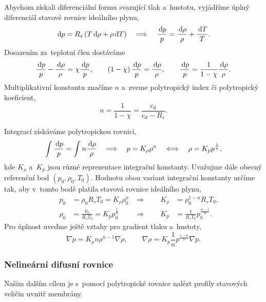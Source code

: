 Abychom získali diferenciální formu svazující tlak a~hustotu, vyjádříme úplný diferenciál stavové rovnice ideálního plynu,
\begin{equation}
    \,\mathrm{d}{p} = R_s\left(T\,\mathrm{d}{\rho} + \rho\,\mathrm{d}{T}\right) \quad \Longrightarrow \quad \frac{\,\mathrm{d}{p}}{p}=\frac{\,\mathrm{d}{\rho}}{\rho}+\frac{\,\mathrm{d}{T}}{T}.
\end{equation}
Dosazením za~teplotní člen dostáváme
\begin{equation}
    \frac{\,\mathrm{d}{p}}{p}-\frac{\,\mathrm{d}{\rho}}{\rho}=\chi\frac{\,\mathrm{d}{p}}{p}, \qquad
    \left(1-\chi\right)\frac{\,\mathrm{d}{p}}{p}=\frac{\,\mathrm{d}{\rho}}{\rho}, \qquad \frac{\,\mathrm{d}{p}}{p}=\frac{1}{1-\chi}\frac{\,\mathrm{d}{\rho}}{\rho}.
\end{equation}
Multiplikativní konstantu značíme $n$ a~zveme polytropický index či polytropický koeficient,
\begin{equation}
    n=\frac{1}{1-\chi}=\frac{c_d}{c_d-R_s}.
\end{equation}

Integrací získáváme polytropickou rovnici,
\begin{equation}\label{eq:polytropic_state_equation}
    \int \frac{\,\mathrm{d}{p}}{p}=\int n \frac{\,\mathrm{d}{\rho}}{\rho}\quad\Longrightarrow\quad p= K_\rho \rho^n\quad\Longleftrightarrow\quad \rho=K_p p^{\frac{1}{n}},
\end{equation}
kde $K_\rho$ a~$K_p$ jsou různé reprezentace integrační konstanty. Uvažujme dále obecný referenční bod $\left(p_0, \rho_0, T_0\right)$. Hodnotu obou variant integrační konstanty určíme tak, aby v~tomto bodě platila stavová rovnice ideálního plynu,
\begin{subequations}
    \begin{align}
        &&&&p_0&=\rho_0 R_s T_0 = K_\rho \rho_0^n &\Longrightarrow\qquad  K_\rho  &= \rho_0^{1-n} R_s T_0,&&\\
        &&&&\rho_0&=\frac{p_0}{R_s T_0}=K_p p_0^{\frac{1}{n}}&\Longrightarrow\qquad  K_p &= \frac{1}{R_s T_0}p_0^{\frac{n-1}{n}}.&&
    \end{align}
\end{subequations}
Pro úplnost uveďme ještě vztahy pro gradient tlaku a~hustoty,
\begin{equation}
    \nabla p = K_\rho n \rho^{n-1}\nabla \rho,\qquad \nabla \rho = K_p \frac{1}{n} p^{\frac{1-n}{n}}\nabla p.
\end{equation}

\subsubsection{Nelineární difusní rovnice}
Naším dalším cílem je s~pomocí polytropické rovnice nalézt profily stavových veličin uvnitř membrány. 

